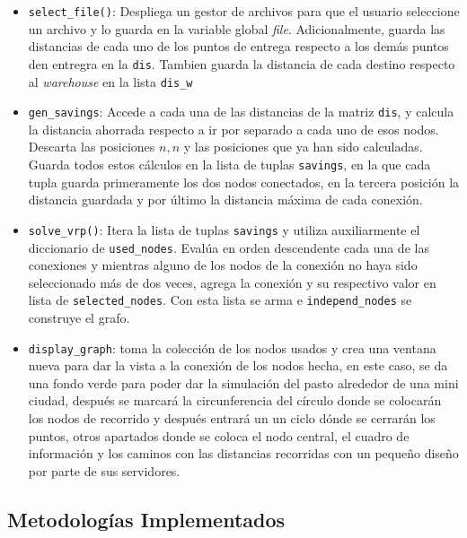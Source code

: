 \documentclass[10pt,twocolumn,letterpaper]{article}
\begin{document}
\begin{itemize}
	\item \texttt{select\_file()}: Despliega un gestor de archivos para que el usuario seleccione un archivo y lo guarda en la variable global \textit{file}. Adicionalmente, guarda las distancias de cada uno de los puntos de entrega respecto a los demás puntos den entregra en la \texttt{dis}. Tambien guarda la distancia de cada destino respecto al \textit{warehouse} en la lista \texttt{dis\_w}
	\item \texttt{gen\_savings}: Accede a cada una de las distancias de la matriz \texttt{dis}, y calcula la distancia ahorrada respecto a ir por separado a cada uno de esos nodos. Descarta las posiciones $n, n$ y las posiciones que ya han sido calculadas. Guarda todos estos cálculos en la lista de tuplas \texttt{savings}, en la que cada tupla guarda primeramente los dos nodos conectados, en la tercera posición la distancia guardada y por último la distancia máxima de cada conexión.
	\item \texttt{solve\_vrp()}: Itera la lista de tuplas \texttt{savings} y utiliza auxiliarmente el diccionario de \texttt{used\_nodes}. Evalúa en orden descendente cada una de las conexiones y mientras alguno de los nodos de la conexión no haya sido seleccionado más de dos veces, agrega la conexión y su respectivo valor en lista de \texttt{selected\_nodes}. Con esta lista se arma e \texttt{independ\_nodes} se construye el grafo.
	\item \texttt{display\_graph}: toma la colección de los nodos usados  y crea una ventana nueva para dar la vista a la conexión de los nodos hecha, en este caso, se da una fondo verde para poder dar la simulación del pasto alrededor de una mini ciudad, después se marcará la circunferencia del círculo donde se colocarán los nodos de recorrido y después entrará un un ciclo dónde se cerrarán los puntos, otros apartados donde se coloca el nodo central, el cuadro de información y los caminos con las distancias recorridas con un pequeño diseño por parte de sus servidores.
\end{itemize}

\subsection{Metodologías Implementados}
\end{document}
